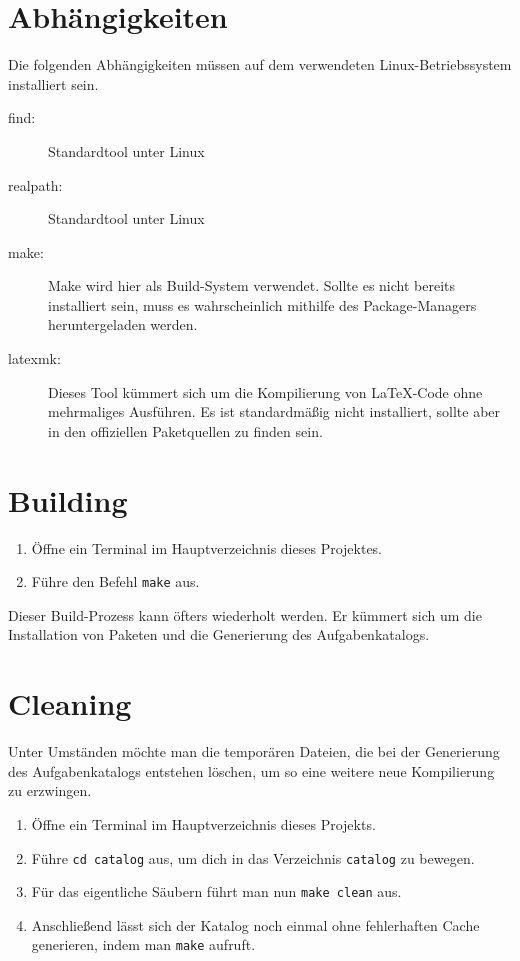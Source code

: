 \documentclass{article}
\begin{document}
  \section{Abhängigkeiten} %
  \label{sec:abhängigkeiten}
    Die folgenden Abhängigkeiten müssen auf dem verwendeten Linux-Betriebssystem installiert sein.
    \begin{description}
      \item[find:] Standardtool unter Linux
      \item[realpath:] Standardtool unter Linux
      \item[make:]
        Make wird hier als Build-System verwendet.
        Sollte es nicht bereits installiert sein, muss es wahrscheinlich mithilfe des Package-Managers heruntergeladen werden.
      \item[latexmk:]
        Dieses Tool kümmert sich um die Kompilierung von \LaTeX-Code ohne mehrmaliges Ausführen.
        Es ist standardmäßig nicht installiert, sollte aber in den offiziellen Paketquellen zu finden sein.
    \end{description}

  \section{Building} %
  \label{sec:building}
    \begin{enumerate}
      \item Öffne ein Terminal im Hauptverzeichnis dieses Projektes.
      \item Führe den Befehl \texttt{make} aus.
    \end{enumerate}
    Dieser Build-Prozess kann öfters wiederholt werden.
    Er kümmert sich um die Installation von Paketen und die Generierung des Aufgabenkatalogs.

  \section{Cleaning} %
  \label{sec:cleaning}
    Unter Umständen möchte man die temporären Dateien, die bei der Generierung des Aufgabenkatalogs entstehen löschen, um so eine weitere neue Kompilierung zu erzwingen.
    \begin{enumerate}
      \item Öffne ein Terminal im Hauptverzeichnis dieses Projekts.
      \item Führe \texttt{cd catalog} aus, um dich in das Verzeichnis \texttt{catalog} zu bewegen.
      \item Für das eigentliche Säubern führt man nun \texttt{make clean} aus.
      \item Anschließend lässt sich der Katalog noch einmal ohne fehlerhaften Cache generieren, indem man \texttt{make} aufruft.
    \end{enumerate}
\end{document}
